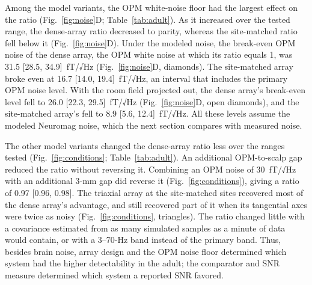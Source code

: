 \documentclass[preprint,12pt,authoryear,a4paper]{elsarticle}
\begin{document}
Among the model variants, the OPM white-noise floor had the largest effect on the ratio (Fig.~\ref{fig:noise}D; Table~\ref{tab:adult}). As it increased over the tested range, the dense-array ratio decreased to parity, whereas the site-matched ratio fell below it (Fig.~\ref{fig:noise}D). Under the modeled noise, the break-even OPM noise of the dense array, the OPM white noise at which its ratio equals 1, was 31.5 [28.5, 34.9]~fT/√Hz (Fig.~\ref{fig:noise}D, diamonds). The site-matched array broke even at 16.7 [14.0, 19.4]~fT/√Hz, an interval that includes the primary OPM noise level. With the room field projected out, the dense array's break-even level fell to 26.0 [22.3, 29.5]~fT/√Hz (Fig.~\ref{fig:noise}D, open diamonds), and the site-matched array's fell to 8.9 [5.6, 12.4]~fT/√Hz. All these levels assume the modeled Neuromag noise, which the next section compares with measured noise.

The other model variants changed the dense-array ratio less over the ranges tested (Fig.~\ref{fig:conditions}; Table~\ref{tab:adult}). An additional OPM-to-scalp gap reduced the ratio without reversing it. Combining an OPM noise of 30~fT/√Hz with an additional 3-mm gap did reverse it (Fig.~\ref{fig:conditions}), giving a ratio of 0.97 [0.96, 0.98]. The triaxial array at the site-matched sites recovered most of the dense array's advantage, and still recovered part of it when its tangential axes were twice as noisy (Fig.~\ref{fig:conditions}, triangles). The ratio changed little with a covariance estimated from as many simulated samples as a minute of data would contain, or with a 3--70-Hz band instead of the primary band. Thus, besides brain noise, array design and the OPM noise floor determined which system had the higher detectability in the adult; the comparator and SNR measure determined which system a reported SNR favored.
\end{document}
